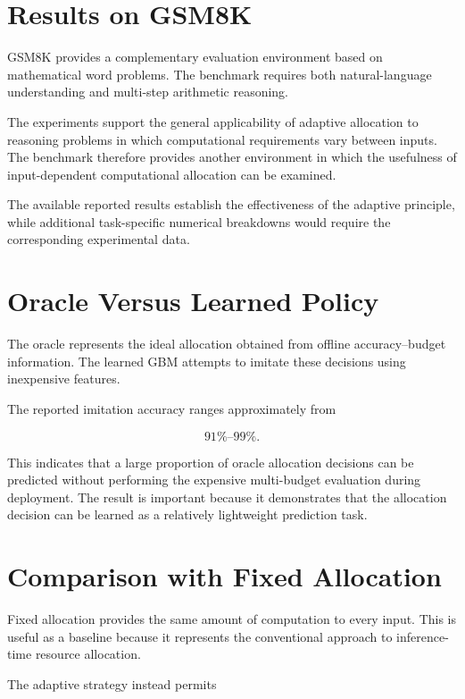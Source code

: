 \documentclass[12pt,a4paper,titlepage]{report}
\begin{document}
\section{Results on GSM8K}

GSM8K provides a complementary evaluation environment based on mathematical word problems. The benchmark requires both natural-language understanding and multi-step arithmetic reasoning.

The experiments support the general applicability of adaptive allocation to reasoning problems in which computational requirements vary between inputs. The benchmark therefore provides another environment in which the usefulness of input-dependent computational allocation can be examined.

The available reported results establish the effectiveness of the adaptive principle, while additional task-specific numerical breakdowns would require the corresponding experimental data.

\section{Oracle Versus Learned Policy}

The oracle represents the ideal allocation obtained from offline accuracy--budget information. The learned GBM attempts to imitate these decisions using inexpensive features.

The reported imitation accuracy ranges approximately from

\begin{equation}
91\%\text{--}99\%.
\end{equation}

This indicates that a large proportion of oracle allocation decisions can be predicted without performing the expensive multi-budget evaluation during deployment. The result is important because it demonstrates that the allocation decision can be learned as a relatively lightweight prediction task.

\section{Comparison with Fixed Allocation}

Fixed allocation provides the same amount of computation to every input. This is useful as a baseline because it represents the conventional approach to inference-time resource allocation.

The adaptive strategy instead permits
\end{document}
